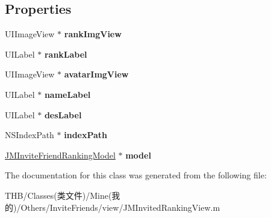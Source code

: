 \subsection*{Properties}
\begin{DoxyCompactItemize}
\item 
\mbox{\label{interface_j_m_invited_ranking_list_cell_ae95fc37448b16fdb1d324aa6ce75dc2d}} 
U\+I\+Image\+View $\ast$ {\bfseries rank\+Img\+View}
\item 
\mbox{\label{interface_j_m_invited_ranking_list_cell_a335165a997b9a0f80f3ce767e8d052a5}} 
U\+I\+Label $\ast$ {\bfseries rank\+Label}
\item 
\mbox{\label{interface_j_m_invited_ranking_list_cell_a0b7678e39e54b368aaba77a1cd3067ee}} 
U\+I\+Image\+View $\ast$ {\bfseries avatar\+Img\+View}
\item 
\mbox{\label{interface_j_m_invited_ranking_list_cell_a7cf4dfc8b9d8f88a22b8be75322ff983}} 
U\+I\+Label $\ast$ {\bfseries name\+Label}
\item 
\mbox{\label{interface_j_m_invited_ranking_list_cell_a0a22943b77f2973a2ec244ac11cc32db}} 
U\+I\+Label $\ast$ {\bfseries des\+Label}
\item 
\mbox{\label{interface_j_m_invited_ranking_list_cell_a52940356baa83be8cab7b9c0b7cbdbe6}} 
N\+S\+Index\+Path $\ast$ {\bfseries index\+Path}
\item 
\mbox{\label{interface_j_m_invited_ranking_list_cell_a2f2902b3a1c3c57cab75d218bd73ea70}} 
\mbox{\hyperlink{interface_j_m_invite_friend_ranking_model}{J\+M\+Invite\+Friend\+Ranking\+Model}} $\ast$ {\bfseries model}
\end{DoxyCompactItemize}


The documentation for this class was generated from the following file\+:\begin{DoxyCompactItemize}
\item 
T\+H\+B/\+Classes(类文件)/\+Mine(我的)/\+Others/\+Invite\+Friends/view/J\+M\+Invited\+Ranking\+View.\+m\end{DoxyCompactItemize}
